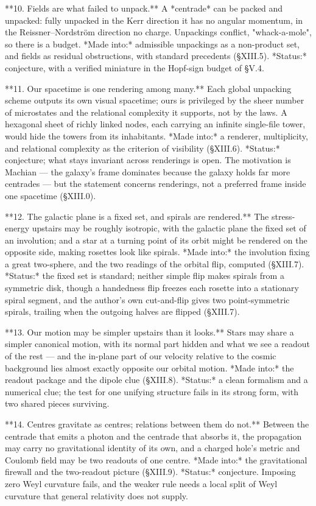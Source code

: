 **10. Fields are what failed to unpack.** A *centrade* can be packed and unpacked: fully unpacked in the Kerr direction it has no angular momentum, in the Reissner–Nordström direction no charge. Unpackings conflict, "whack-a-mole", so there is a budget. *Made into:* admissible unpackings as a non-product set, and fields as residual obstructions, with standard precedents (§XIII.5). *Status:* conjecture, with a verified miniature in the Hopf-sign budget of §V.4.

**11. Our spacetime is one rendering among many.** Each global unpacking scheme outputs its own visual spacetime; ours is privileged by the sheer number of microstates and the relational complexity it supports, not by the laws. A hexagonal sheet of richly linked nodes, each carrying an infinite single-file tower, would hide the towers from its inhabitants. *Made into:* a renderer, multiplicity, and relational complexity as the criterion of visibility (§XIII.6). *Status:* conjecture; what stays invariant across renderings is open. The motivation is Machian — the galaxy's frame dominates because the galaxy holds far more centrades — but the statement concerns renderings, not a preferred frame inside one spacetime (§XIII.0).

**12. The galactic plane is a fixed set, and spirals are rendered.** The stress-energy upstairs may be roughly isotropic, with the galactic plane the fixed set of an involution; and a star at a turning point of its orbit might be rendered on the opposite side, making rosettes look like spirals. *Made into:* the involution fixing a great two-sphere, and the two readings of the orbital flip, computed (§XIII.7). *Status:* the fixed set is standard; neither simple flip makes spirals from a symmetric disk, though a handedness flip freezes each rosette into a stationary spiral segment, and the author's own cut-and-flip gives two point-symmetric spirals, trailing when the outgoing halves are flipped (§XIII.7).

**13. Our motion may be simpler upstairs than it looks.** Stars may share a simpler canonical motion, with its normal part hidden and what we see a readout of the rest — and the in-plane part of our velocity relative to the cosmic background lies almost exactly opposite our orbital motion. *Made into:* the readout package and the dipole clue (§XIII.8). *Status:* a clean formalism and a numerical clue; the test for one unifying structure fails in its strong form, with two shared pieces surviving.

**14. Centres gravitate as centres; relations between them do not.** Between the centrade that emits a photon and the centrade that absorbs it, the propagation may carry no gravitational identity of its own, and a charged hole's metric and Coulomb field may be two readouts of one centre. *Made into:* the gravitational firewall and the two-readout picture (§XIII.9). *Status:* conjecture. Imposing zero Weyl curvature fails, and the weaker rule needs a local split of Weyl curvature that general relativity does not supply.

